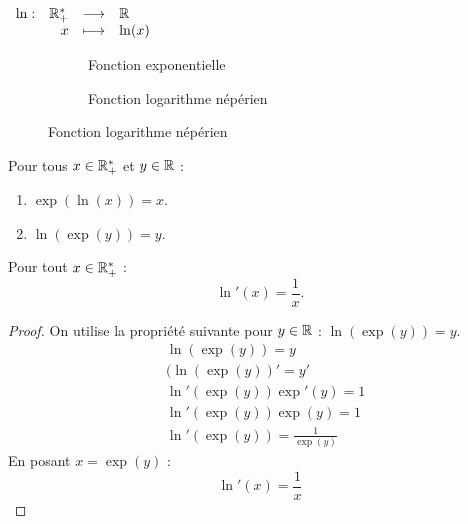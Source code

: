 \begin{definition}
	\begin{center}
		$
		\begin{array}{rrcl} \ln : & \mathbb{R}_+^* & \longrightarrow & \mathbb{R} \\ & x & \longmapsto & \ln(x) \end{array}
		$
	\end{center}
\end{definition}

\begin{figure}[!h]
	\centering
	\begin{subfigure}{0.45\textwidth}
		\caption{Fonction exponentielle}
	\end{subfigure}
	\begin{subfigure}{0.45\textwidth}
		\caption{Fonction logarithme népérien}
	\end{subfigure}
\end{figure}

\begin{proposition}
	Pour tous $x \in \mathbb{R}_+^*$ et $y \in \mathbb{R}$ :
    \begin{multicols}{2}
        \begin{enumerate}
            \item $\exp(\ln(x)) = x$.
            \item $\ln(\exp(y)) = y$.
        \end{enumerate}
    \end{multicols}
\end{proposition}

\begin{proposition}
	Pour tout $x \in \mathbb{R}_+^*$ :
	\[ \ln'(x) = \frac{1}{x}. \]
\end{proposition}

\begin{proof}
	On utilise la propriété suivante pour $y \in \mathbb{R}$ : $\ln(\exp(y)) = y$.
	\begin{align*}
		&\ln(\exp(y)) = y \\
		&(\ln(\exp(y))' = y' \\
		&\ln'(\exp(y)) \exp'(y) = 1 \\
		&\ln'(\exp(y)) \exp(y) = 1 \\
		&\ln'(\exp(y)) = \frac{1}{\exp(y)}
	\end{align*}
	En posant $x = \exp(y)$ :
	\[ \ln'(x) = \frac{1}{x} \]
\end{proof}

